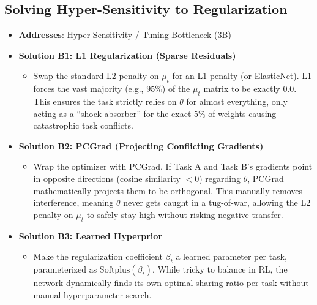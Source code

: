 \documentclass[11pt,a4paper]{article}
\begin{document}
\subsection{Solving Hyper-Sensitivity to Regularization}
\begin{itemize}
    \item \textbf{Addresses}: Hyper-Sensitivity / Tuning Bottleneck (3B)
    \item \textbf{Solution B1: L1 Regularization (Sparse Residuals)}
    \begin{itemize}
        \item Swap the standard L2 penalty on $\mu_t$ for an L1 penalty (or ElasticNet). L1 forces the vast majority (e.g., $95\%$) of the $\mu_t$ matrix to be exactly $0.0$. This ensures the task strictly relies on $\theta$ for almost everything, only acting as a ``shock absorber'' for the exact $5\%$ of weights causing catastrophic task conflicts.
    \end{itemize}
    \item \textbf{Solution B2: PCGrad (Projecting Conflicting Gradients)}
    \begin{itemize}
        \item Wrap the optimizer with PCGrad. If Task A and Task B's gradients point in opposite directions (cosine similarity $< 0$) regarding $\theta$, PCGrad mathematically projects them to be orthogonal. This manually removes interference, meaning $\theta$ never gets caught in a tug-of-war, allowing the L2 penalty on $\mu_t$ to safely stay high without risking negative transfer.
    \end{itemize}
    \item \textbf{Solution B3: Learned Hyperprior}
    \begin{itemize}
        \item Make the regularization coefficient $\beta_t$ a learned parameter per task, parameterized as $\text{Softplus}(\beta_t)$. While tricky to balance in RL, the network dynamically finds its own optimal sharing ratio per task without manual hyperparameter search.
    \end{itemize}
\end{itemize}
\end{document}

